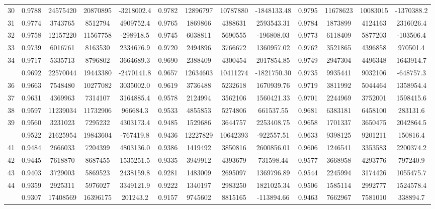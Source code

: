 \documentclass[
  12pt,
]{article}
\begin{document}
\begin{longtable}[t]{lcccccccccccc}
30 & 0.9788 & 24575420 & 20870895 & -3218002.4 & 0.9782 & 12896797 & 10787880 & -1848133.48 & 0.9795 & 11678623 & 10083015 & -1370388.2\\
31 & 0.9774 & 3743765 & 8512794 & 4909752.4 & 0.9765 & 1869866 & 4388631 & 2593543.31 & 0.9784 & 1873899 & 4124163 & 2316026.4\\
32 & 0.9758 & 12157220 & 11567758 & -298918.5 & 0.9745 & 6038811 & 5690555 & -196808.03 & 0.9773 & 6118409 & 5877203 & -103506.4\\
33 & 0.9739 & 6016761 & 8163530 & 2334676.9 & 0.9720 & 2494896 & 3766672 & 1360957.02 & 0.9762 & 3521865 & 4396858 & 970501.4\\
34 & 0.9717 & 5335713 & 8796802 & 3664689.3 & 0.9690 & 2388409 & 4300454 & 2017854.85 & 0.9749 & 2947304 & 4496348 & 1643914.7\\
\addlinespace
35 & 0.9692 & 22570044 & 19443380 & -2470141.8 & 0.9657 & 12634603 & 10411274 & -1821750.30 & 0.9735 & 9935441 & 9032106 & -648757.3\\
36 & 0.9663 & 7548480 & 10277082 & 3035002.0 & 0.9619 & 3736488 & 5232618 & 1670939.76 & 0.9719 & 3811992 & 5044464 & 1358954.4\\
37 & 0.9631 & 4369963 & 7314107 & 3164885.4 & 0.9578 & 2124994 & 3562106 & 1560421.33 & 0.9701 & 2244969 & 3752001 & 1598415.6\\
38 & 0.9597 & 11239034 & 11732906 & 966684.3 & 0.9533 & 4855853 & 5274806 & 661537.55 & 0.9681 & 6383181 & 6458100 & 283131.6\\
39 & 0.9560 & 3231023 & 7295232 & 4303173.4 & 0.9485 & 1529686 & 3644757 & 2253408.75 & 0.9658 & 1701337 & 3650475 & 2042864.5\\
\addlinespace
40 & 0.9522 & 21625954 & 19843604 & -767419.8 & 0.9436 & 12227829 & 10642393 & -922557.51 & 0.9633 & 9398125 & 9201211 & 150816.4\\
41 & 0.9484 & 2666033 & 7204399 & 4803136.0 & 0.9386 & 1419492 & 3850816 & 2600856.01 & 0.9606 & 1246541 & 3353583 & 2200374.2\\
42 & 0.9445 & 7618870 & 8687455 & 1535251.5 & 0.9335 & 3949912 & 4393679 & 731598.44 & 0.9577 & 3668958 & 4293776 & 797240.9\\
43 & 0.9403 & 3729003 & 5869523 & 2438159.8 & 0.9281 & 1483009 & 2695097 & 1369796.89 & 0.9544 & 2245994 & 3174426 & 1055475.7\\
44 & 0.9359 & 2925311 & 5976027 & 3349121.9 & 0.9222 & 1340197 & 2983250 & 1821025.34 & 0.9506 & 1585114 & 2992777 & 1524578.4\\
\addlinespace
45 & 0.9307 & 17408569 & 16396175 & 201243.2 & 0.9157 & 9745602 & 8815165 & -113894.66 & 0.9463 & 7662967 & 7581010 & 338894.7\\

\end{longtable}
\end{document}
